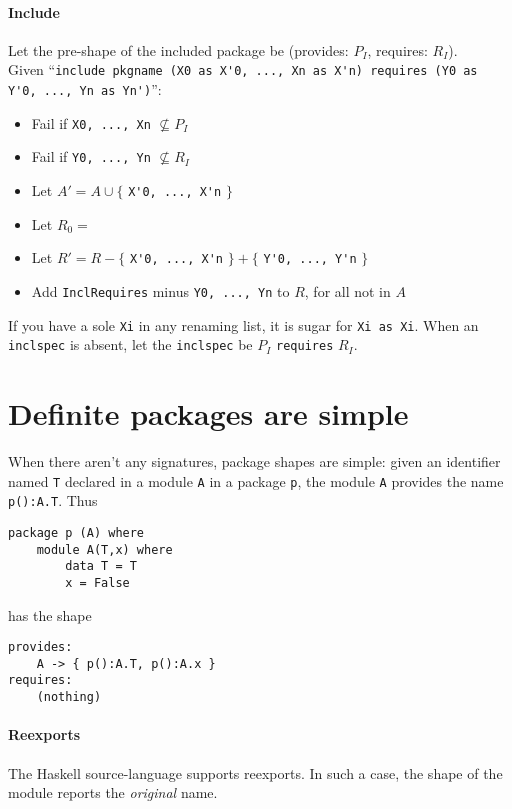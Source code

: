 \documentclass{article}
\begin{document}
\paragraph{Include}

Let the pre-shape of the included package be (provides: $P_I$, requires: $R_I$). \\
Given ``\verb|include pkgname (X0 as X'0, ..., Xn as X'n) requires (Y0 as Y'0, ..., Yn as Yn')|'':

\begin{itemize}
    \item Fail if \verb|X0, ..., Xn| $\nsubseteq P_I$
    \item Fail if \verb|Y0, ..., Yn| $\nsubseteq R_I$
    \item Let $A' = A \cup \{$ \verb|X'0, ..., X'n| $\}$
    \item Let $R_0 = $
    \item Let $R' = R - \{$ \verb|X'0, ..., X'n| $\} + \{$ \verb|Y'0, ..., Y'n| $\}$
    \item Add \verb|InclRequires| minus \verb|Y0, ..., Yn| to $R$, for all not in $A$
\end{itemize}

If you have a sole \verb|Xi| in any renaming list, it is sugar for \verb|Xi as Xi|. When an
\verb|inclspec| is absent, let the \verb|inclspec| be $P_I$ \verb|requires| $R_I$.

\section{Definite packages are simple}

When there aren't any signatures, package shapes are simple:
given an identifier named \verb|T| declared in a module \verb|A| in a package \verb|p|,
the module \verb|A| provides the name \verb|p():A.T|.  Thus

\begin{verbatim}
package p (A) where
    module A(T,x) where
        data T = T
        x = False
\end{verbatim}

has the shape

\begin{verbatim}
provides:
    A -> { p():A.T, p():A.x }
requires:
    (nothing)
\end{verbatim}

\paragraph{Reexports}  The Haskell source-language supports reexports.
In such a case, the shape of the module reports the \emph{original}
name.
\end{document}
